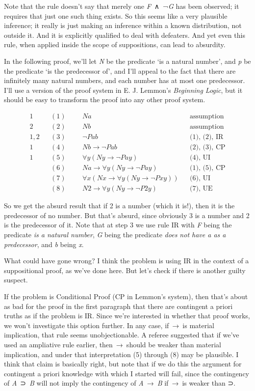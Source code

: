 \documentclass[
  11pt,
  letterpaper,
  DIV=11,
  numbers=noendperiod,
  twoside]{scrartcl}
\begin{document}
Note that the rule doesn't say that merely one \emph{F}~∧~¬\emph{G} has
been observed; it requires that just one such thing exists. So this
seems like a very plausible inference; it really is just making an
inference within a known distribution, not outside it. And it is
explicitly qualified to deal with defeaters. And yet even this rule,
when applied inside the scope of suppositions, can lead to absurdity.

In the following proof, we'll let \emph{N} be the predicate `is a
natural number', and \emph{p} be the predicate `is the predecessor of',
and I'll appeal to the fact that there are infinitely many natural
numbers, and each number has at most one predecessor. I'll use a version
of the proof system in E. J. Lemmon's \emph{Beginning Logic}, but it
should be easy to transform the proof into any other proof system.

\[
\begin{aligned}
1 && (1) && &Na && \text{assumption} \\
2 && (2) && &Nb && \text{assumption} \\
1, 2 && (3) && &\neg Pab && \text{(1), (2), IR} \\
1 && (4)  && &Nb \rightarrow \neg Pab && \text{(2), (3), CP} \\
1 && (5)  && &\forall y (Ny \rightarrow \neg Pay) && \text{(4), UI} \\
 && (6)  && &Na \rightarrow \forall y (Ny \rightarrow \neg Pay) && \text{(1), (5), CP} \\
 && (7) && &\forall x (Nx \rightarrow \forall y (Ny \rightarrow \neg Pxy)) && \text{(6), UI} \\
 && (8) && &N2 \rightarrow \forall y (Ny \rightarrow \neg P2y) && \text{(7), UE}
\end{aligned}
\]

So we get the absurd result that if 2 is a number (which it is!), then
it is the predecessor of no number. But that's absurd, since obviously 3
is a number and 2 is the predecessor of it. Note that at step 3 we use
rule IR with \emph{F} being the predicate \emph{is a natural number},
\emph{G} being the predicate \emph{does not have a as a predecessor},
and \emph{b} being \emph{x}.

What could have gone wrong? I think the problem is using IR in the
context of a suppositional proof, as we've done here. But let's check if
there is another guilty suspect.

If the problem is Conditional Proof (CP in Lemmon's system), then that's
about as bad for the proof in the first paragraph that there are
contingent a priori truths as if the problem is IR. Since we're
interested in whether that proof works, we won't investigate this option
further. In any case, if~→~is material implication, that rule seems
unobjectionable. A referee suggested that if we've used an ampliative
rule earlier, then~→~should be weaker than material implication, and
under that interpretation (5) through (8) may be plausible. I think that
claim is basically right, but note that if we do this the argument for
contingent a priori knowledge with which I started will fail, since the
contingency of \emph{A}~⊃~\emph{B} will not imply the contingency of
\emph{A}~→~\emph{B} if~→~is weaker than ⊃.
\end{document}
